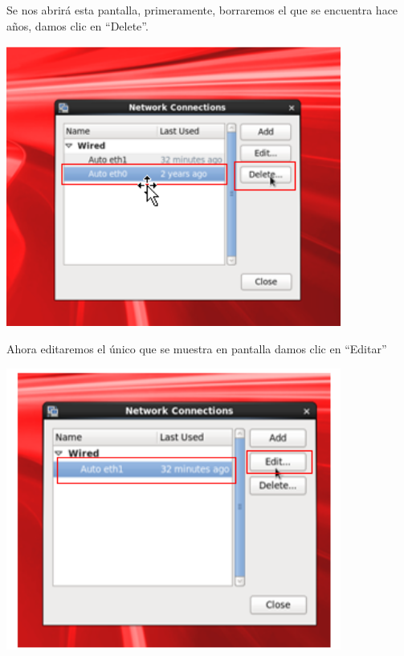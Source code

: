 Se nos abrirá esta pantalla, primeramente, borraremos el que se encuentra hace años, damos clic en “Delete”.
	\begin{center}
		\includegraphics[width=11cm]{./Imagenes/36} 
	\end{center} 

\vspace{\baselineskip}

Ahora editaremos el único que se muestra en pantalla damos clic en “Editar”
	\begin{center}
		\includegraphics[width=11cm]{./Imagenes/37} 
	\end{center} 

\newpage

